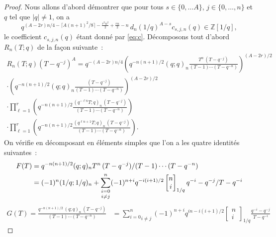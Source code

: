 \documentclass[12pt]{amsart}
\theoremstyle{remark}
\numberwithin{equation}{section}
\begin{document}
\begin{proof} Nous allons d'abord d{\'e}montrer que pour 
tous $s\in\{0,\ldots A\}$, $j\in\{0, \dots, n\}$ et $q$ tel que $\vert q\vert\ne 1$, on a
$$
q^{(A-2r)n/4-\lceil A (n+1)^2/8\rceil
-\frac {r^2n^2} {2}+\frac {rn} {2}- n}\,
d_n(1/q)^{A-s} c_{s,j,n}(q)\in\mathbb{Z}[1/q],
$$ 
le coefficient $c_{s,j,n}(q)$ {\'e}tant donn{\'e} par \eqref{eq:c}.
D{\'e}composons
  tout d'abord $R_n(T;q)$ de la fa{\c c}on suivante~:
\begin{multline*}
R_n(T;q)(T-q^{-j})^A=q^{-(A-2r)n/4}\left(q^{-n(n+1)/2}(q;q)_n
\frac{T^n\,(T-q^{-j})}{(T-1)\cdots(T-q^{-n})}
\right)^{(A-2r)/2}\\
\cdot
\left(q^{-n(n+1)/2}(q;q)_n\frac{(T-q^{-j})}{(T-1)\cdots(T-q^{-n})}
\right)^{(A-2r)/2}\\
\cdot\prod_{\ell=1}^r\left(q^{-n(n+1)/2}\frac{(q^{-\ell n}T;q)_n\,(T-q^{-j})}
{(T-1)\cdots(T-q^{-n})}\right)\\
\cdot\prod_{\ell=1}^r\left(q^{-n(n+1)/2}\frac{(q^{\ell n+1}T;q)_n\,(T-q^{-j})}
{(T-1)\cdots(T-q^{-n})}\right).
\end{multline*}
On v{\'e}rifie en d{\'e}composant en {\'e}l{\'e}ments simples que l'on a les
quatre identit{\'e}s suivantes~:
\begin{align} \label{eq:F1}
F(T)&=q^{-n(n+1)/2}(q;q)_n\frac{T^n\,(T-q^{-j})}{(T-1)\cdots(T-q^{-n})}\\
\notag
&=(-1)^n(1/q;1/q)_n+
\underset{i\ne j}{\sum_{{i=0}}^n} (-1)^{n+i} 
q^{-i(i+1)/2}\begin{bmatrix} n\\  i\end{bmatrix}_{1/q}
\frac{q^{-i}-q^{-j}}{T-q^{-i}}
\end{align}
\begin{align} 
G(T)=\frac{q^{-n(n+1)/2}\,(q;q)_n\,(T-q^{-j})}{(T-1)\cdots(T-q^{-n})}
\label{eq:G1}
&=
\underset{i\ne j}{\sum_{{i=0}}^n} (-1)^{n+i}
q^{in-i(i+1)/2}\begin{bmatrix} n\\  i\end{bmatrix}_{1/q}
\frac{q^{-i}-q^{-j}}{T-q^{-i}}

\end{align}
\end{proof}
\end{document}
